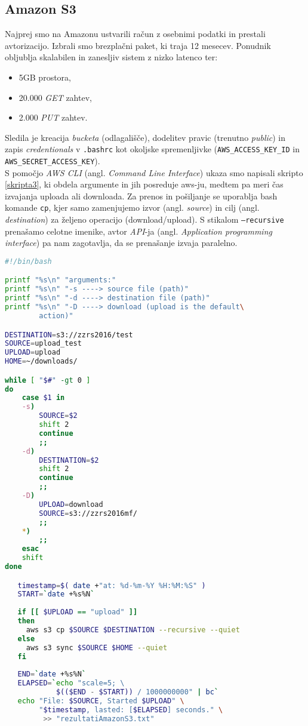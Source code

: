 \documentclass[11pt]{article}
\begin{document}
\subsection{Amazon S3}
Najprej smo na Amazonu ustvarili račun z osebnimi podatki in prestali avtorizacijo. Izbrali smo brezplačni paket, ki traja 12 mesecev. Ponudnik obljublja skalabilen in zanesljiv sistem z nizko latenco ter:
\begin{itemize}
    \item 5GB prostora,
    \item 20.000 \textit{GET} zahtev,
    \item 2.000 \textit{PUT} zahtev.
\end{itemize}

Sledila je kreacija \textit{bucketa} (odlagališče), dodelitev pravic (trenutno \textit{public}) in zapis \textit{credentionals} v \texttt{.bashrc} kot okoljske spremenljivke (\texttt{AWS\_ACCESS\_KEY\_ID} in\\ \texttt{AWS\_SECRET\_ACCESS\_KEY}). \\
S pomočjo \textit{AWS CLI} (angl. \textit{Command Line Interface}) ukaza smo napisali skripto \ref{skripta3}, ki obdela argumente in jih posreduje aws-ju, medtem pa meri čas izvajanja uploada ali downloada. Za prenos in pošiljanje se uporablja bash komande \texttt{cp}, kjer samo zamenjujemo izvor (angl. \textit{source}) in cilj (angl. \textit{destination}) za željeno operacijo (download/upload). S stikalom \texttt{--recursive} prenašamo celotne imenike, avtor \textit{API}-ja (angl. \textit{Application programming interface}) pa nam zagotavlja, da se prenašanje izvaja paralelno.\\

\begin{lstlisting}[language=bash, captionpos=b, caption={Skripta za testiranje Amazon S3 storitve.}, label={skripta3}]
#!/bin/bash

printf "%s\n" "arguments:"
printf "%s\n" "-s ----> source file (path)"
printf "%s\n" "-d ----> destination file (path)"
printf "%s\n" "-D ----> download (upload is the default\
        action)"

DESTINATION=s3://zzrs2016/test
SOURCE=upload_test
UPLOAD=upload
HOME=~/downloads/

while [ "$#" -gt 0 ]
do
    case $1 in
    -s)
	    SOURCE=$2
	    shift 2
	    continue
	    ;;
    -d)
    	DESTINATION=$2
    	shift 2
    	continue
    	;;
    -D)
    	UPLOAD=download
    	SOURCE=s3://zzrs2016mf/
    	;;
    *)
	    ;;
    esac
    shift
done

   timestamp=$( date +"at: %d-%m-%Y %H:%M:%S" )
   START=`date +%s%N`
   
   if [[ $UPLOAD == "upload" ]]
   then
     aws s3 cp $SOURCE $DESTINATION --recursive --quiet 
   else
     aws s3 sync $SOURCE $HOME --quiet
   fi
   
   END=`date +%s%N`
   ELAPSED=`echo "scale=5; \ 
            $(($END - $START)) / 1000000000" | bc`
   echo "File: $SOURCE, Started $UPLOAD" \
        "$timestamp, lasted: [$ELAPSED] seconds." \
         >> "rezultatiAmazonS3.txt"

\end{lstlisting}
\end{document}
